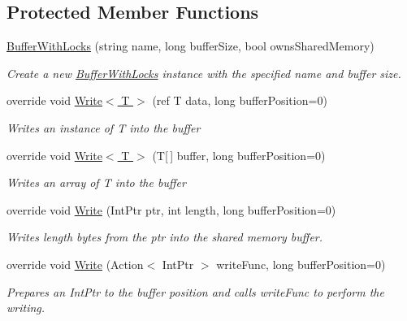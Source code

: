 \subsection*{Protected Member Functions}
\begin{DoxyCompactItemize}
\item 
\hyperlink{class_shared_memory_1_1_buffer_with_locks_ac8f5ccb965d0a899744f5364c8140480}{Buffer\+With\+Locks} (string name, long buffer\+Size, bool owns\+Shared\+Memory)
\begin{DoxyCompactList}\small\item\em Create a new \hyperlink{class_shared_memory_1_1_buffer_with_locks}{Buffer\+With\+Locks} instance with the specified name and buffer size. \end{DoxyCompactList}\item 
override void \hyperlink{class_shared_memory_1_1_buffer_with_locks_a270a03b398be5cb2c9d3fca8be14129b}{Write$<$ T $>$} (ref T data, long buffer\+Position=0)
\begin{DoxyCompactList}\small\item\em Writes an instance of {\itshape T}  into the buffer \end{DoxyCompactList}\item 
override void \hyperlink{class_shared_memory_1_1_buffer_with_locks_a8abfbb585b8bdea85b9ff71111b55679}{Write$<$ T $>$} (T\mbox{[}$\,$\mbox{]} buffer, long buffer\+Position=0)
\begin{DoxyCompactList}\small\item\em Writes an array of {\itshape T}  into the buffer \end{DoxyCompactList}\item 
override void \hyperlink{class_shared_memory_1_1_buffer_with_locks_a13ed00d01404247565ad3caf1fc4a032}{Write} (Int\+Ptr ptr, int length, long buffer\+Position=0)
\begin{DoxyCompactList}\small\item\em Writes {\itshape length}  bytes from the {\itshape ptr}  into the shared memory buffer. \end{DoxyCompactList}\item 
override void \hyperlink{class_shared_memory_1_1_buffer_with_locks_a80c23992356dd3b7613f34223cf6b1fb}{Write} (Action$<$ Int\+Ptr $>$ write\+Func, long buffer\+Position=0)
\begin{DoxyCompactList}\small\item\em Prepares an Int\+Ptr to the buffer position and calls {\itshape write\+Func}  to perform the writing. \end{DoxyCompactList}\item 

\end{DoxyCompactItemize}
